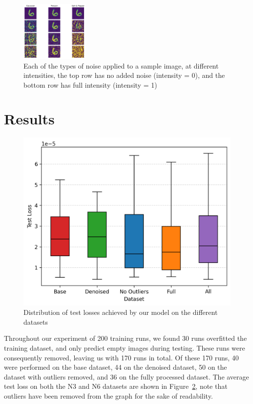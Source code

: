 \documentclass[twocolumn]{article}
\begin{document}
\begin{figure}
    \centering
    \includegraphics[width=0.3\textwidth]{assets/noise.png}
    \caption{Each of the types of noise applied to a sample image, at different intensities, the top row has no added noise (intensity = 0), and the bottom row has full intensity (intensity = 1) }
    \label{fig:noise}
\end{figure}

\section{Results}

\begin{figure}
    \centering
    \includegraphics[scale=0.4]{assets/results-bar.png}
    \caption{Distribution of test losses achieved by our model on the different datasets}
    \label{fig:loss}
\end{figure}

Throughout our experiment of 200 training runs, we found 30 runs overfitted the training dataset, and only predict empty images during testing. These runs were consequently removed, leaving us with 170 runs in total. Of these 170 runs, 40 were performed on the base dataset, 44 on the denoised dataset, 50 on the dataset with outliers removed, and 36 on the fully processed dataset. The average test loss on both the N3 and N6 datasets are shown in Figure~\ref{fig:loss}, note that outliers have been removed from the graph for the sake of readability. 
\end{document}
